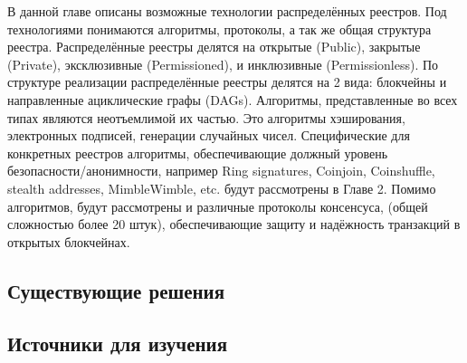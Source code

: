 В данной главе описаны возможные технологии распределённых реестров. Под
технологиями понимаются алгоритмы, протоколы, а так же общая структура реестра.
Распределённые реестры делятся на открытые (Public), закрытые (Private),
эксклюзивные (Permissioned), и инклюзивные (Permissionless).
По структуре реализации распределённые реестры делятся на 2 вида: блокчейны и
направленные ациклические графы (DAGs). Алгоритмы, представленные во всех типах
являются неотъемлимой их частью. Это алгоритмы хэширования, электронных
подписей, генерации случайных чисел. Специфические для конкретных реестров
алгоритмы, обеспечивающие должный уровень безопасности/анонимности, например
Ring signatures, Coinjoin, Coinshuffle, stealth addresses, MimbleWimble, etc.
будут рассмотрены в Главе 2. Помимо алгоритмов, будут рассмотрены и различные
протоколы консенсуса, (общей сложностью более 20 штук), обеспечивающие защиту и
надёжность транзакций в открытых блокчейнах.

\subsection{Существующие решения}


\newpage

\subsection{Источники для изучения}


